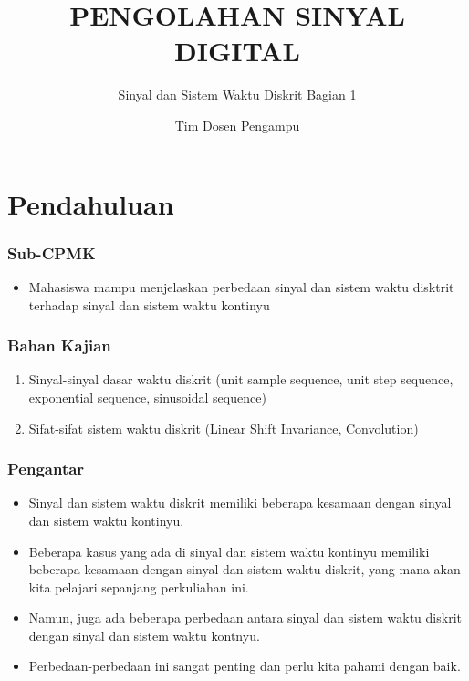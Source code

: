 \documentclass[pdflatex,compress]{beamer}
\title{PENGOLAHAN SINYAL DIGITAL}
\subtitle{Sinyal dan Sistem Waktu Diskrit Bagian 1}
\author{Tim Dosen Pengampu}
\begin{document}
\maketitle

\section{Pendahuluan}

\begin{frame}
	\frametitle{Sub-CPMK}
	\begin{itemize}
		\item Mahasiswa mampu menjelaskan perbedaan sinyal dan sistem waktu disktrit terhadap sinyal dan sistem waktu kontinyu
	\end{itemize}
\end{frame}

\begin{frame}
	\frametitle{Bahan Kajian}
	\begin{enumerate}
		\item Sinyal-sinyal dasar waktu diskrit (unit sample sequence, unit step sequence, exponential sequence, sinusoidal sequence)
		\item Sifat-sifat sistem waktu diskrit (Linear Shift Invariance, Convolution)
	\end{enumerate}
\end{frame}

\begin{frame}
	\frametitle{Pengantar}
	\begin{itemize}
		\item Sinyal dan sistem waktu diskrit memiliki beberapa kesamaan dengan sinyal dan sistem waktu kontinyu.
		\item Beberapa kasus yang ada di sinyal dan sistem waktu kontinyu memiliki beberapa kesamaan dengan sinyal dan sistem waktu diskrit, yang mana akan kita pelajari sepanjang perkuliahan ini.
		\item Namun, juga ada beberapa perbedaan antara sinyal dan sistem waktu diskrit dengan sinyal dan sistem waktu kontnyu.
		\item Perbedaan-perbedaan ini sangat penting dan perlu kita pahami dengan baik.
	\end{itemize}
\end{frame}
\end{document}
